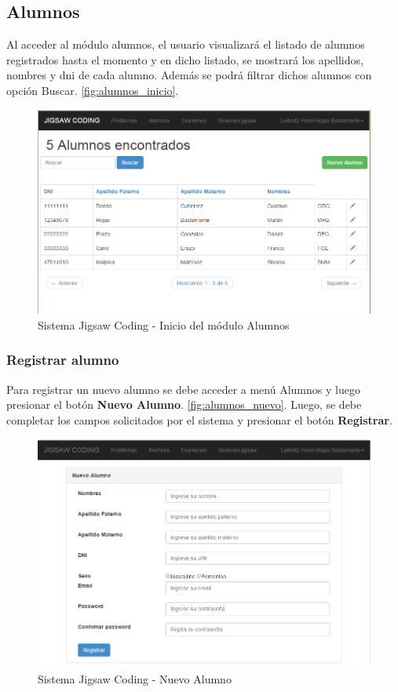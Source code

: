 \subsection{Alumnos}
Al acceder al módulo alumnos, el usuario visualizará el listado de alumnos registrados hasta el momento y en dicho listado, se mostrará los apellidos, nombres y dni de cada alumno. Además se podrá filtrar dichos alumnos con opción Buscar. \autoref{fig:alumnos_inicio}.

\begin{figure}[h!]
	\centering
	\caption[SJC Alumnos]{Sistema Jigsaw Coding - Inicio del módulo Alumnos}
	\label{fig:alumnos_inicio}
	\includegraphics[scale=0.5]{figuras/usodelsistema/docente/alumnos_inicio}
\end{figure}

\subsubsection{Registrar alumno}

Para registrar un nuevo alumno se debe acceder a menú Alumnos y luego presionar el botón \textbf{Nuevo Alumno}. \autoref{fig:alumnos_nuevo}. Luego, se debe completar los campos solicitados por el sistema y presionar el botón \textbf{Registrar}.

\begin{figure}[h!]
	\centering
	\caption[SJC Nuevo alumno]{Sistema Jigsaw Coding - Nuevo Alumno}
	\label{fig:alumnos_nuevo}
	\includegraphics[scale=0.5]{figuras/usodelsistema/docente/alumnos_nuevo}
\end{figure}


